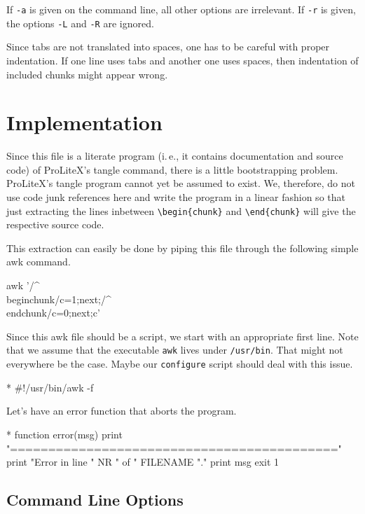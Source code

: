 \documentclass[a4paper]{article} %
\newcommand{\packagename}[1]{{\normalfont\sffamily#1}}
\newcommand\ProLiteX{\textsf{ProLiteX}}
\newcommand{\ie}{i.\,e.}
\begin{document}
If \texttt{-a} is given on the command line, all other options are
irrelevant. If \texttt{-r} is given, the options \texttt{-L} and
\texttt{-R} are ignored.


Since tabs are not translated into spaces, one has to be careful with
proper indentation. If one line uses tabs and another one uses spaces,
then indentation of included chunks might appear wrong.


\section{Implementation}

Since this file is a literate program (\ie, it contains documentation
and source code) of \ProLiteX's tangle command, there is a little
bootstrapping problem. \ProLiteX's tangle program cannot yet be
assumed to exist. We, therefore, do not use code junk references here
and write the program in a linear fashion so that just extracting the
lines inbetween \verb|\begin{chunk}| and \verb|\end{chunk}| will give
the respective source code.

This extraction can easily be done by piping this file through the
following simple \packagename{awk} command.
\begin{myverbatim}
  awk '/^\\begin{chunk}/{c=1;next};/^\\end{chunk}/{c=0;next};c'
\end{myverbatim}

Since this \packagename{awk} file should be a script, we start with an
appropriate first line. Note that we assume that the executable
\texttt{awk} lives under \texttt{/usr/bin}. That might not everywhere
be the case. Maybe our \texttt{configure} script should deal with
this issue.
\begin{chunk}{*}
#!/usr/bin/awk -f
\end{chunk}

Let's have an error function that aborts the program.
\begin{chunk}{*}
function error(msg) {
  print "==========================================="
  print "Error in line " NR " of " FILENAME "."
  print msg
  exit 1
}
\end{chunk}

\subsection{Command Line Options}
\end{document}
